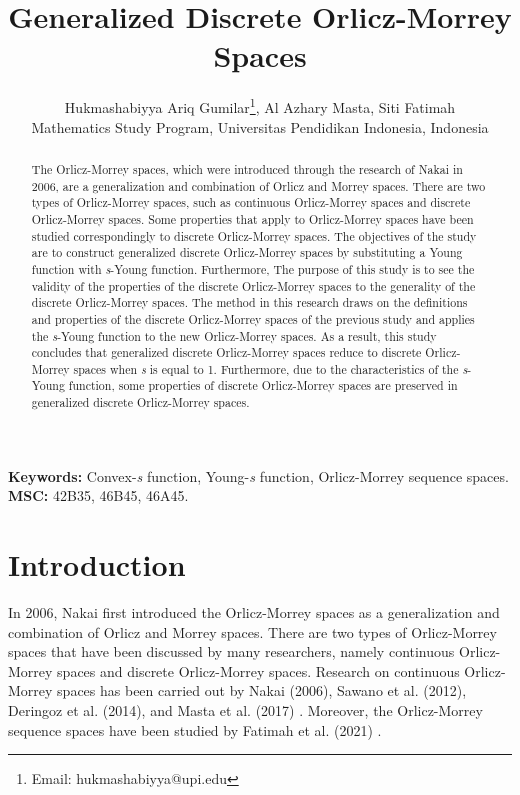 \documentclass[12pt,a4paper]{article}
\title{\textbf{Generalized Discrete Orlicz-Morrey Spaces}\\[0.5em]}
\author{
  Hukmashabiyya Ariq Gumilar\thanks{Email: hukmashabiyya@upi.edu}, Al Azhary Masta, Siti Fatimah\\
  \small{Mathematics Study Program, Universitas Pendidikan Indonesia, Indonesia}
}
\date{}
\theoremstyle{remark}
\begin{document}
\maketitle

\begin{abstract}
The Orlicz-Morrey spaces, which were introduced through the research of Nakai in 2006, are a generalization and combination of Orlicz and Morrey spaces. There are two types of Orlicz-Morrey spaces, such as continuous Orlicz-Morrey spaces and discrete Orlicz-Morrey spaces. Some properties that apply to Orlicz-Morrey spaces have been studied correspondingly to discrete Orlicz-Morrey spaces. The objectives of the study are to construct generalized discrete Orlicz-Morrey spaces by substituting a Young function with \emph{s}-Young function. Furthermore, The purpose of this study is to see the validity of the properties of the discrete Orlicz-Morrey spaces to the generality of the discrete Orlicz-Morrey spaces. The method in this research draws on the definitions and properties of the discrete Orlicz-Morrey spaces of the previous study and applies the \emph{s}-Young function to the new Orlicz-Morrey spaces. As a result, this study concludes that generalized discrete Orlicz-Morrey spaces reduce to discrete Orlicz-Morrey spaces when \emph{s} is equal to 1. Furthermore, due to the characteristics of the \emph{s}-Young function, some properties of discrete Orlicz-Morrey spaces are preserved in generalized discrete Orlicz-Morrey spaces.
\end{abstract}

\noindent\textbf{Keywords:} Convex-\emph{s} function, Young-\emph{s} function, Orlicz-Morrey sequence spaces.\\
\noindent \textbf{MSC:} 42B35, 46B45, 46A45.

\section{Introduction}
In 2006, Nakai first introduced the Orlicz-Morrey spaces as a generalization and combination of Orlicz and Morrey spaces. There are two types of Orlicz-Morrey spaces that have been discussed by many researchers, namely continuous Orlicz-Morrey spaces and discrete Orlicz-Morrey spaces. Research on continuous Orlicz-Morrey spaces has been carried out by Nakai (2006), Sawano et al. (2012), Deringoz et al. (2014), and Masta et al. (2017) \cite{ref1, ref2, ref3, ref4, ref5, ref6}. Moreover, the Orlicz-Morrey sequence spaces have been studied by Fatimah et al. (2021) \cite{ref7}.\\
\end{document}
